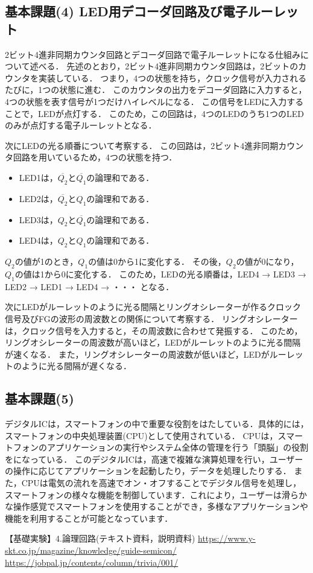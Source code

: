 \documentclass{ltjsarticle}
\begin{document}
\subsection{基本課題(4) LED用デコーダ回路及び電子ルーレット}
2ビット4進非同期カウンタ回路とデコーダ回路で電子ルーレットになる仕組みについて述べる．
先述のとおり，2ビット4進非同期カウンタ回路は，2ビットのカウンタを実装している．
つまり，4つの状態を持ち，クロック信号が入力されるたびに，1つの状態に進む．
このカウンタの出力をデコーダ回路に入力すると，4つの状態を表す信号が1つだけハイレベルになる．
この信号をLEDに入力することで，LEDが点灯する．
このため，この回路は，4つのLEDのうち1つのLEDのみが点灯する電子ルーレットとなる．

\vspace{\baselineskip}
次にLEDの光る順番について考察する．
この回路は，2ビット4進非同期カウンタ回路を用いているため，4つの状態を持つ．
\begin{itemize}
  \item LED1は，$\overline{Q_2}$と$\overline{Q_1}$の論理和である．
  \item LED2は，$\overline{Q_2}$と${Q_1}$の論理和である．
  \item LED3は，${Q_2}$と$\overline{Q_1}$の論理和である．
  \item LED4は，${Q_2}$と${Q_1}$の論理和である．
\end{itemize}
${Q_2}$の値が1のとき，${Q_1}$の値は0から1に変化する．
その後，${Q_2}$の値が0になり，${Q_1}$の値は1から0に変化する．
このため，LEDの光る順番は，LED4 → LED3 → LED2 → LED1 → LED4 → ・・・ となる．

\vspace{\baselineskip}
次にLEDがルーレットのように光る間隔とリングオシレーターが作るクロック信号及びFGの波形の周波数との関係について考察する．
リングオシレーターは，クロック信号を入力すると，その周波数に合わせて発振する．
このため，リングオシレーターの周波数が高いほど，LEDがルーレットのように光る間隔が速くなる．
また，リングオシレーターの周波数が低いほど，LEDがルーレットのように光る間隔が遅くなる．

\subsection{基本課題(5)}
デジタルICは，スマートフォンの中で重要な役割をはたしている．具体的には，スマートフォンの中央処理装置(CPU)として使用されている．
CPUは，スマートフォンのアプリケーションの実行やシステム全体の管理を行う「頭脳」の役割をになっている．
このデジタルICは，高速で複雑な演算処理を行い，ユーザーの操作に応じてアプリケーションを起動したり，データを処理したりする．
また，CPUは電気の流れを高速でオン・オフすることでデジタル信号を処理し，スマートフォンの様々な機能を制御しています．これにより，ユーザーは滑らかな操作感覚でスマートフォンを使用することができ，多様なアプリケーションや機能を利用することが可能となっています．

\begin{thebibliography}{9}
   【基礎実験】4.論理回路(テキスト資料，説明資料)
   \url{https://www.y-skt.co.jp/magazine/knowledge/guide-semicon/}
   \url{https://jobpal.jp/contents/column/trivia/001/}
\end{thebibliography}
\end{document}
